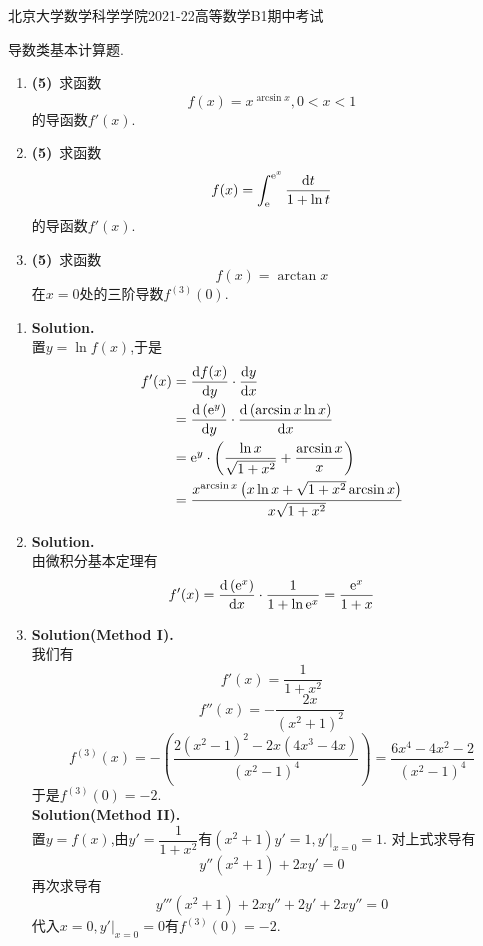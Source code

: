 \documentclass{ctexart}
\begin{document}
\pagestyle{empty}
\begin{center}\Large
    北京大学数学科学学院2021-22高等数学B1期中考试
\end{center}
\begin{problem}[1.(15\songti{分})]
    导数类基本计算题.
    \begin{enumerate}[label=\textbf{(\arabic*)}]
        \item \textbf{(5)}\ 求函数$$f(x)=x^{\arcsin x},0<x<1$$的导函数$f'(x)$.
        \item \textbf{(5)}\ 求函数$$f(x)=\int_{\mathrm{e}}^{\mathrm{e}^x}\dfrac{\mathrm{d} t}{1+\ln t}$$的导函数$f'(x)$.
        \item \textbf{(5)}\ 求函数$$f(x)=\arctan x$$在$x=0$处的三阶导数$f^{(3)}(0)$.
    \end{enumerate}
\end{problem}
\begin{solution}
    \begin{enumerate}[label=\textbf{(\arabic*)}]
        \item \textbf{Solution.}\\
            置$y=\ln f(x)$,于是
            $$\begin{aligned}
                f'(x)
                &= \dfrac{\mathrm{d} f(x)}{\mathrm{d} y}\cdot\dfrac{\mathrm{d} y}{\mathrm{d} x} \\
                &= \dfrac{\mathrm{d}\left(\mathrm{e}^y\right)}{\mathrm{d} y}\cdot\dfrac{\mathrm{d}\left(\arcsin x\ln x\right)}{\mathrm{d} x} \\
                &= \mathrm{e}^y\cdot\left(\dfrac{\ln x}{\sqrt{1+x^2}}+\dfrac{\arcsin x}{x}\right) \\
                &= \dfrac{x^{\arcsin x}\left(x\ln x+\sqrt{1+x^2}\arcsin x\right)}{x\sqrt{1+x^2}}
            \end{aligned}$$
        \item \textbf{Solution.}\\
            由微积分基本定理有$$f'(x)=\dfrac{\mathrm{d}\left(\mathrm{e}^x\right)}{\mathrm{d} x}\cdot\dfrac{1}{1+\ln\mathrm{e}^x}=\dfrac{\mathrm{e}^x}{1+x}$$
        \item \textbf{Solution(Method I).}\\
            我们有$$f'(x)=\dfrac{1}{1+x^2}$$
            $$f''(x)=-\dfrac{2x}{(x^2+1)^2}$$
            $$f^{(3)}(x)=-\left(\dfrac{2(x^2-1)^2-2x(4x^3-4x)}{(x^2-1)^4}\right)=\dfrac{6x^4-4x^2-2}{(x^2-1)^4}$$
            于是$f^{(3)}(0)=-2$.\\
            \textbf{Solution(Method II).}\\
            置$y=f(x)$,由$y'=\dfrac{1}{1+x^2}$有$(x^2+1)y'=1,y'|_{x=0}=1$.
            对上式求导有$$y''(x^2+1)+2xy'=0$$
            再次求导有$$y'''(x^2+1)+2xy''+2y'+2xy''=0$$
            代入$x=0,y'|_{x=0}=0$有$f^{(3)}(0)=-2$.
    \end{enumerate}
\end{solution}
\end{document}
